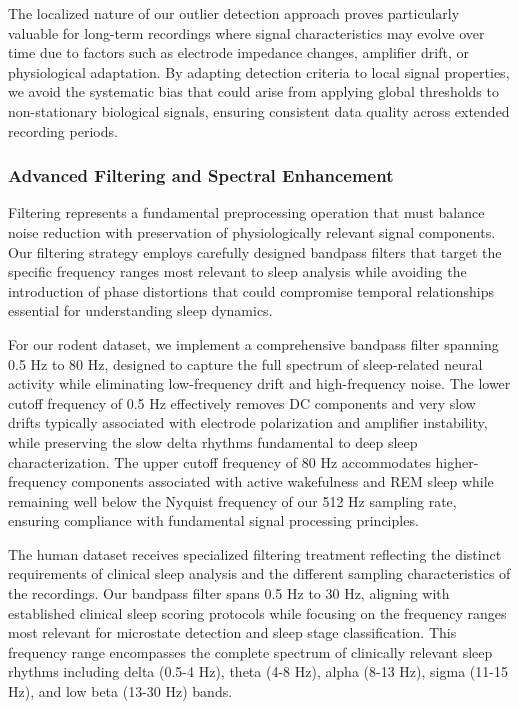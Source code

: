 \documentclass[a4paper,12pt,twoside]{article}
\begin{document}
The localized nature of our outlier detection approach proves particularly valuable for long-term recordings where signal characteristics may evolve over time due to factors such as electrode impedance changes, amplifier drift, or physiological adaptation. By adapting detection criteria to local signal properties, we avoid the systematic bias that could arise from applying global thresholds to non-stationary biological signals, ensuring consistent data quality across extended recording periods.

\subsubsection{Advanced Filtering and Spectral Enhancement}

Filtering represents a fundamental preprocessing operation that must balance noise reduction with preservation of physiologically relevant signal components. Our filtering strategy employs carefully designed bandpass filters that target the specific frequency ranges most relevant to sleep analysis while avoiding the introduction of phase distortions that could compromise temporal relationships essential for understanding sleep dynamics.

For our rodent dataset, we implement a comprehensive bandpass filter spanning 0.5 Hz to 80 Hz, designed to capture the full spectrum of sleep-related neural activity while eliminating low-frequency drift and high-frequency noise. The lower cutoff frequency of 0.5 Hz effectively removes DC components and very slow drifts typically associated with electrode polarization and amplifier instability, while preserving the slow delta rhythms fundamental to deep sleep characterization. The upper cutoff frequency of 80 Hz accommodates higher-frequency components associated with active wakefulness and REM sleep while remaining well below the Nyquist frequency of our 512 Hz sampling rate, ensuring compliance with fundamental signal processing principles.

The human dataset receives specialized filtering treatment reflecting the distinct requirements of clinical sleep analysis and the different sampling characteristics of the recordings. Our bandpass filter spans 0.5 Hz to 30 Hz, aligning with established clinical sleep scoring protocols while focusing on the frequency ranges most relevant for microstate detection and sleep stage classification. This frequency range encompasses the complete spectrum of clinically relevant sleep rhythms including delta (0.5-4 Hz), theta (4-8 Hz), alpha (8-13 Hz), sigma (11-15 Hz), and low beta (13-30 Hz) bands.
\end{document}
